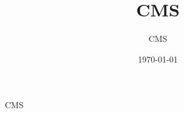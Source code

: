 \documentclass[UTF8]{ctexart}
\title{CMS}
\author{CMS}
\date{\today}
\begin{document}
\maketitle
CMS
\end{document}
